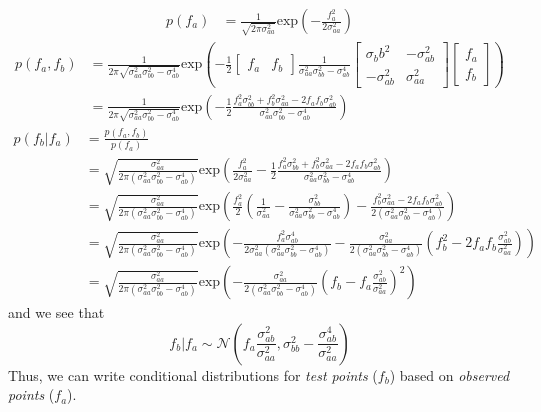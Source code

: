 \documentclass{article}
\begin{document}
\begin{align}
p(f_a) & = \frac{1}{\sqrt{2\pi\sigma^2_{aa}}} \mathrm{exp}\left(-\frac{f_a^2}{2\sigma^2_{aa}} \right)
\end{align}
\begin{align}
p(f_a, f_b) & = \frac{1}{2\pi\sqrt{\sigma^2_{aa}\sigma^2_{bb} - \sigma^4_{ab}}} \mathrm{exp}\left( -\frac{1}{2} \begin{bmatrix} f_a & f_b \end{bmatrix} \frac{1}{\sigma^2_{aa}\sigma^2_{bb} - \sigma^4_{ab}}\begin{bmatrix} \sigma_bb^2 & -\sigma_{ab}^2 \\ -\sigma_{ab}^2 & \sigma_{aa}^2 \end{bmatrix} \begin{bmatrix} f_a \\ f_b \end{bmatrix} \right) \nonumber \\
            & = \frac{1}{2\pi\sqrt{\sigma^2_{aa}\sigma^2_{bb} - \sigma^4_{ab}}} \mathrm{exp}\left( -\frac{1}{2} \frac{f_a^2\sigma_{bb}^2 + f_b^2\sigma_{aa}^2 - 2f_a f_b \sigma_{ab}^2}{\sigma^2_{aa}\sigma^2_{bb} - \sigma^4_{ab}} \right)
\end{align}
\begin{align}
p(f_b|f_a) & = \frac{p(f_a, f_b)}{p(f_a)} \nonumber \\
           & = \sqrt{\frac{\sigma_{aa}^2}{2\pi\left(\sigma_{aa}^2\sigma_{bb}^2 - \sigma_{ab}^4\right)}}\mathrm{exp}\left( \frac{f_a^2}{2\sigma_{aa}^2} - \frac{1}{2} \frac{f_a^2\sigma_{bb}^2 + f_b^2\sigma_{aa}^2 - 2f_a f_b \sigma_{ab}^2}{\sigma^2_{aa}\sigma^2_{bb} - \sigma^4_{ab}}\right) \nonumber \\
           & = \sqrt{\frac{\sigma_{aa}^2}{2\pi\left(\sigma_{aa}^2\sigma_{bb}^2 - \sigma_{ab}^4\right)}}\mathrm{exp}\left( \frac{f_a^2}{2}\left(\frac{1}{\sigma_{aa}^2} - \frac{\sigma_{bb}^2}{\sigma_{aa}^2\sigma_{bb}^2-\sigma_{ab}^4}\right) - \frac{f_b^2 \sigma_{aa}^2 - 2 f_a f_b \sigma_{ab}^2}{2\left(\sigma_{aa}^2\sigma_{bb}^2 - \sigma_{ab}^4\right)}\right) \nonumber \\
           & = \sqrt{\frac{\sigma_{aa}^2}{2\pi\left(\sigma_{aa}^2\sigma_{bb}^2 - \sigma_{ab}^4\right)}}\mathrm{exp}\left( -\frac{f_a^2\sigma_{ab}^4}{2\sigma_{aa}^2\left(\sigma_{aa}^2\sigma_{bb}^2 - \sigma_{ab}^4\right)} - \frac{\sigma_{aa}^2}{2\left(\sigma_{aa}^2\sigma_{bb}^2 - \sigma_{ab}^4\right)}\left(f_b^2 - 2f_af_b\frac{\sigma_{ab}^2}{\sigma_{aa}^2}\right)\right) \nonumber \\
           & = \sqrt{\frac{\sigma_{aa}^2}{2\pi\left(\sigma_{aa}^2\sigma_{bb}^2 - \sigma_{ab}^4\right)}}\mathrm{exp}\left( - \frac{\sigma_{aa}^2}{2\left(\sigma_{aa}^2\sigma_{bb}^2 - \sigma_{ab}^4\right)} \left(f_b - f_a\frac{\sigma_{ab}^2}{\sigma_{aa}^2}\right)^2 \right)
\end{align}
and we see that
\begin{equation}
 f_b|f_a \sim \mathcal{N}\left(f_a\frac{\sigma_{ab}^2}{\sigma_{aa}^2}, \sigma_{bb}^2 - \frac{\sigma_{ab}^4}{\sigma_{aa}^2}\right)
\end{equation}
Thus, we can write conditional distributions for \textit{test points} ($f_b$) based on \textit{observed points} ($f_a$).
\end{document}
